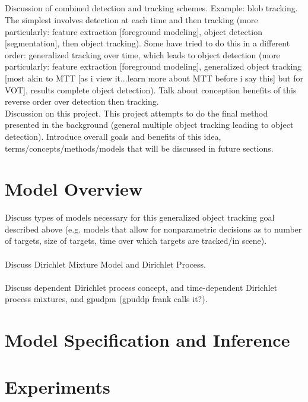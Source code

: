 \documentclass{article}
\begin{document}
\subsection*{}
Discussion of combined detection and tracking schemes. Example: blob tracking. The simplest involves detection at each time and then tracking (more particularly: feature extraction [foreground modeling], object detection [segmentation], then object tracking). Some have tried to do this in a different order: generalized tracking over time, which leads to object detection (more particularly: feature extraction [foreground modeling], generalized object tracking [most akin to MTT [as i view it...learn more about MTT before i say this] but for VOT], results complete object detection). Talk about conception benefits of this reverse order over detection then tracking.
\\
Discussion on this project. This project attempts to do the final method presented in the background (general multiple object tracking leading to object detection). Introduce overall goals and benefits of this idea, terms/concepts/methods/models that will be discussed in future sections.




\section*{Model Overview}
Discuss types of models necessary for this generalized object tracking goal described above (e.g. models that allow for nonparametric decisions as to number of targets, size of targets, time over which targets are tracked/in scene). \\
\\
Discuss Dirichlet Mixture Model and Dirichlet Process.\\
\\
Discuss dependent Dirichlet process concept, and time-dependent Dirichlet process mixtures, and gpudpm (gpuddp frank calls it?).




\section*{Model Specification and Inference}




\section*{Experiments}
\end{document}
